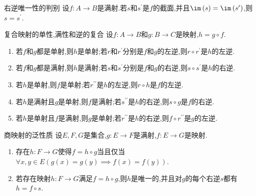 \begin{proposition}{右逆唯一性的判别}{}
	设$f:A\to B$是满射.若$s$和$s^{\prime}$是$f$的截面,并且$\im\left(s\right)=\im\left(s^{\prime}\right)$,则$s=s^{\prime}$.
\end{proposition}

\begin{theorem}{复合映射的单性,满性和逆的复合}{}
	设$f:A\to B$和$g:B\to C$是映射,$h=g\circ f$.
	\begin{enumerate}
		\item 若$f$和$g$都是单射,则$h$是单射;若$r$和$r^{\prime}$分别是$f$和$g$的左逆,则$r\circ r^{\prime}$是$h$的左逆.
		\item 若$f$和$g$都是满射,则$h$是满射;若$s$和$s^{\prime}$分别是$f$和$g$的右逆,则$s\circ s^{\prime}$是$h$的右逆.
		\item 若$h$是单射,则$f$是单射;若$r^{\prime\prime}$是$h$的左逆,则$r\circ h$是$f$的左逆.
		\item 若$h$是满射且$g$是单射,则$f$是满射;若$s^{\prime\prime}$是$h$的右逆,则$s\circ g$是$f$的右逆.
		\item 若$h$是单射且$f$是满射,则$g$是单射;若$r^{\prime\prime}$是$h$的右逆,则$f\circ r^{\prime\prime}$是$g$的左逆.
	\end{enumerate}
\end{theorem}

\begin{proposition}{商映射的泛性质}{}
	设$E,F,G$是集合,$g:E\to F$是满射,$f:E\to G$是映射.
	\begin{center}
	\end{center}
	\begin{enumerate}
		\item 存在$h:F\to G$使得$f=h\circ g$当且仅当$\forall x,y\in E\left(g\left(x\right)=g\left(y\right)\implies f\left(x\right)=f\left(y\right)\right)$.
		\item 若存在映射$h:F\to G$满足$f=h\circ g$,则$h$是唯一的,并且对$g$的每个右逆$s$都有$h=f\circ s$.
	\end{enumerate}
\end{proposition}

